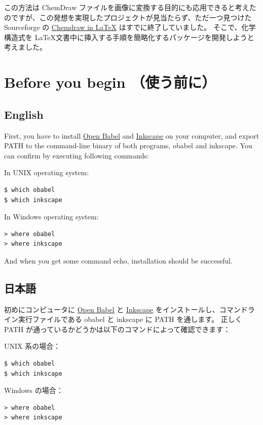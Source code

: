 \documentclass[12pt]{jsarticle}
\begin{document}
この方法は ChemDraw ファイルを画像に変換する目的にも応用できると考えたのですが、この発想を実現したプロジェクトが見当たらず、ただ一つ見つけた Sourceforge の \href{http://chemdrawinlatex.sourceforge.net/}{Chemdraw in \LaTeX} はすでに終了していました。
そこで、化学構造式を \LaTeX 文書中に挿入する手順を簡略化するパッケージを開発しようと考えました。

\clearpage

\section{Before you begin （使う前に）}

\subsection{English}

First, you have to install \href{http://openbabel.org/}{Open Babel} and \href{https://inkscape.org/en/}{Inkscape} on your computer, and export PATH to the command-line binary of both programs, obabel and inkscape.
You can confirm by executing following commands:

In UNIX operating system:
\begin{verbatim}
$ which obabel
$ which inkscape
\end{verbatim}

In Windows operating system:
\begin{verbatim}
> where obabel
> where inkscape
\end{verbatim}

And when you get some command echo, installation should be successful.

\subsection{日本語}

初めにコンピュータに \href{http://openbabel.org/}{Open Babel} と \href{https://inkscape.org/ja/}{Inkscape} をインストールし、コマンドライン実行ファイルである obabel と inkscape に PATH を通します。
正しく PATH が通っているかどうかは以下のコマンドによって確認できます：

UNIX 系の場合：
\begin{verbatim}
$ which obabel
$ which inkscape
\end{verbatim}

Windows の場合：
\begin{verbatim}
> where obabel
> where inkscape
\end{verbatim}
\end{document}
